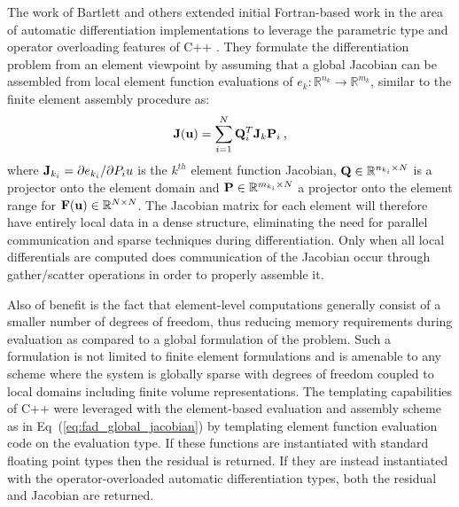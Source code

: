 The work of Bartlett and others \citep{bartlett_automatic_2006}
extended initial Fortran-based work in the area of automatic
differentiation implementations to leverage the parametric type and
operator overloading features of C++ \citep{stroustrup_c++_1997}. They
formulate the differentiation problem from an element viewpoint by
assuming that a global Jacobian can be assembled from local element
function evaluations of $e_k : \mathbb{R}^{n_k} \rightarrow
\mathbb{R}^{m_k}$, similar to the finite element assembly procedure
as:
\begin{equation}
  \mathbf{J}(\mathbf{u}) = \sum_{i=1}^N \mathbf{Q}^T_i \mathbf{J}_k \mathbf{P}_i\:,
  \label{eq:fad_global_jacobian}
\end{equation}
where $\mathbf{J}_{k_i} = \partial e_{k_i} / \partial P_i u$ is the
$k^{th}$ element function Jacobian, $\mathbf{Q} \in \mathbb{R}^{n_{k_i}
  \times N}$ is a projector onto the element domain and $\mathbf{P} \in
\mathbb{R}^{m_{k_i} \times N}$ a projector onto the element range for
$\mathbf{F}(\mathbf{u}) \in \mathbb{R}^{N \times N}$. The Jacobian matrix for
each element will therefore have entirely local data in a dense
structure, eliminating the need for parallel communication and sparse
techniques during differentiation. Only when all local differentials
are computed does communication of the Jacobian occur through
gather/scatter operations in order to properly assemble it. 

Also of benefit is the fact that element-level computations generally
consist of a smaller number of degrees of freedom, thus reducing
memory requirements during evaluation as compared to a global
formulation of the problem. Such a formulation is not limited to
finite element formulations and is amenable to any scheme where the
system is globally sparse with degrees of freedom coupled to local
domains including finite volume representations. The templating
capabilities of C++ were leveraged with the element-based evaluation
and assembly scheme as in Eq~(\ref{eq:fad_global_jacobian}) by
templating element function evaluation code on the evaluation type. If
these functions are instantiated with standard floating point types
then the residual is returned. If they are instead instantiated with
the operator-overloaded automatic differentiation types, both the
residual and Jacobian are returned.

